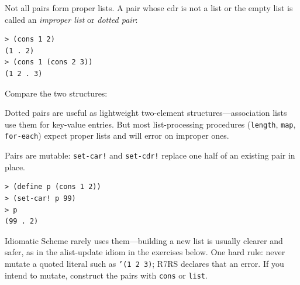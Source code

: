 Not all pairs form proper lists. A pair whose cdr is not a list or the empty list is called an \emph{improper list} or \emph{dotted pair}:

\begin{lstlisting}[style=repl]
> (cons 1 2)
(1 . 2)
> (cons 1 (cons 2 3))
(1 2 . 3)
\end{lstlisting}

Compare the two structures:

\begin{center}
\end{center}

Dotted pairs are useful as lightweight two-element structures---association lists use them for key-value entries. But most list-processing procedures (\texttt{length}, \texttt{map}, \texttt{for-each}) expect proper lists and will error on improper ones.

\begin{note}
Pairs are mutable: \texttt{set-car!} and \texttt{set-cdr!} replace one half of an existing pair in place.

\begin{lstlisting}[style=repl]
> (define p (cons 1 2))
> (set-car! p 99)
> p
(99 . 2)
\end{lstlisting}

Idiomatic Scheme rarely uses them---building a new list is usually clearer and safer, as in the alist-update idiom in the exercises below. One hard rule: never mutate a quoted literal such as \texttt{'(1 2 3)}; R7RS declares that an error. If you intend to mutate, construct the pairs with \texttt{cons} or \texttt{list}.
\end{note}

